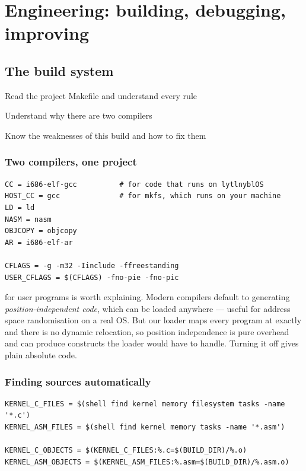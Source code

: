 \part{Engineering: building, debugging, improving}

\chapter{The build system}

\begin{goals}
  \item Read the project Makefile and understand every rule
  \item Understand why there are two compilers
  \item Know the weaknesses of this build and how to fix them
\end{goals}

\section{Two compilers, one project}

\begin{lstlisting}[style=mk]
CC = i686-elf-gcc          # for code that runs on lytlnyblOS
HOST_CC = gcc              # for mkfs, which runs on your machine
LD = ld
NASM = nasm
OBJCOPY = objcopy
AR = i686-elf-ar

CFLAGS = -g -m32 -Iinclude -ffreestanding
USER_CFLAGS = $(CFLAGS) -fno-pie -fno-pic
\end{lstlisting}

 for user programs is worth explaining. Modern compilers default to
generating \emph{position-independent code}, which can be loaded anywhere --- useful for address
space randomisation on a real OS. But our loader maps every program at exactly  and
there is no dynamic relocation, so position independence is pure overhead and can produce
constructs the loader would have to handle. Turning it off gives plain absolute code.

\section{Finding sources automatically}

\begin{lstlisting}[style=mk]
KERNEL_C_FILES = $(shell find kernel memory filesystem tasks -name '*.c')
KERNEL_ASM_FILES = $(shell find kernel memory tasks -name '*.asm')

KERNEL_C_OBJECTS = $(KERNEL_C_FILES:%.c=$(BUILD_DIR)/%.o)
KERNEL_ASM_OBJECTS = $(KERNEL_ASM_FILES:%.asm=$(BUILD_DIR)/%.asm.o)
\end{lstlisting}

